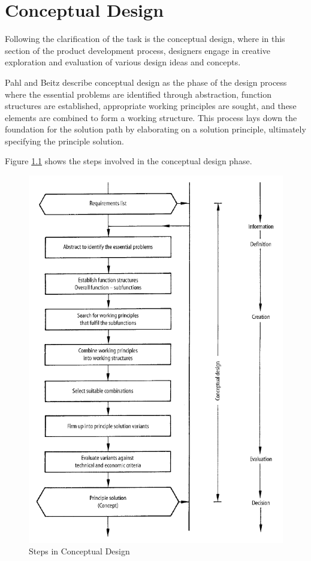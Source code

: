 \chapter{Conceptual Design}
Following the clarification of the task is the conceptual design, where in this section of the product development process, designers engage in creative exploration and evaluation of various design ideas and concepts.

Pahl and Beitz describe conceptual design as the phase of the design process where the essential problems are identified through abstraction, function structures are established, appropriate working principles are sought, and these elements are combined to form a working structure. This process lays down the foundation for the solution path by elaborating on a solution principle, ultimately specifying the principle solution. \cite{Pahl07d}

Figure \ref{fig:steps-conceptual-design} shows the steps involved in the conceptual design phase.

\begin{figure}[ht!]
    \centering
    \includegraphics[width=0.7\linewidth]{texs/Part1/chapter3/image/conceptual.png}
    \caption{Steps in Conceptual Design \cite{Pahl07p}}
    \label{fig:steps-conceptual-design}
\end{figure}


